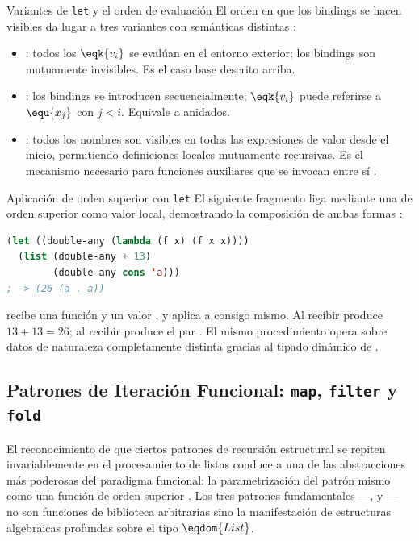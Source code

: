 \begin{observacion}{Variantes de \texttt{let} y el orden de evaluación}
El orden en que los bindings se hacen visibles da lugar a tres variantes con semánticas distintas \cite{SICP, HtDP}:
\begin{itemize}
    \item {}: todos los $\eqk{v_i}$ se evalúan en el entorno exterior; los bindings son mutuamente invisibles. Es el caso base descrito arriba.
    \item {}: los bindings se introducen secuencialmente; $\eqk{v_i}$ puede referirse a $\equ{x_j}$ con $j < i$. Equivale a  anidados.
    \item {}: todos los nombres son visibles en todas las expresiones de valor desde el inicio, permitiendo definiciones locales mutuamente recursivas. Es el mecanismo necesario para funciones auxiliares que se invocan entre sí \cite{SICP}.
\end{itemize}
\end{observacion}

\begin{ejemplo}{Aplicación de orden superior con \texttt{let}}
El siguiente fragmento liga mediante  una  de orden superior como valor local, demostrando la composición de ambas formas \cite{SICP}:
\begin{lstlisting}[language=Lisp, caption={let con función de orden superior}]
(let ((double-any (lambda (f x) (f x x))))
  (list (double-any + 13)
        (double-any cons 'a)))
; -> (26 (a . a))
\end{lstlisting}
 recibe una función  y un valor , y aplica  a  consigo mismo. Al recibir \eqop{+} produce $13 + 13 = 26$; al recibir  produce el par . El mismo procedimiento opera sobre datos de naturaleza completamente distinta gracias al tipado dinámico de  \cite{SICP}.
\end{ejemplo}

\subsection{Patrones de Iteración Funcional: \texttt{map}, \texttt{filter} y \texttt{fold}}
\label{subsec:4_4_3_hof_patrones}

El reconocimiento de que ciertos patrones de recursión estructural se repiten invariablemente en el procesamiento de listas conduce a una de las abstracciones más poderosas del paradigma funcional: la parametrización del patrón mismo como una función de orden superior \cite{SICP}. Los tres patrones fundamentales —,  y — no son funciones de biblioteca arbitrarias sino la manifestación de estructuras algebraicas profundas sobre el tipo $\eqdom{List}$.


